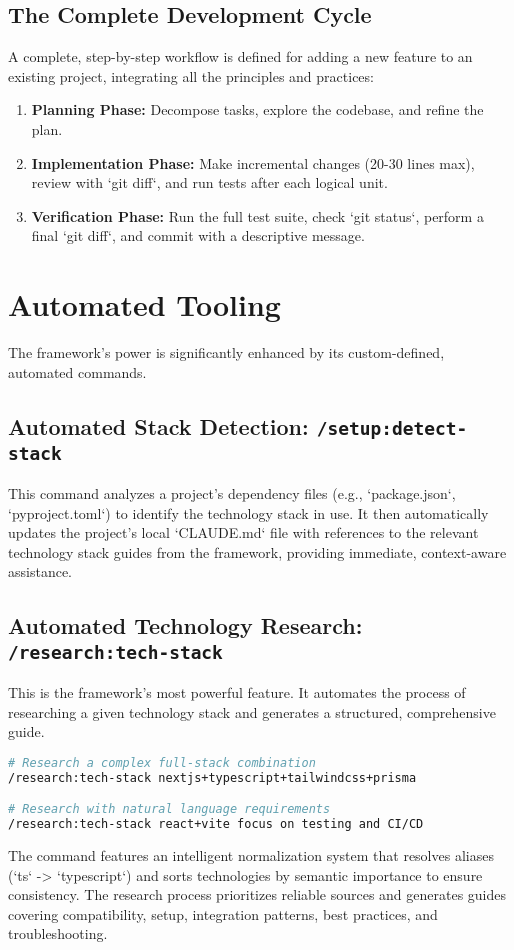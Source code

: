 \documentclass[preprint,12pt]{elsarticle}
\begin{document}
\subsection{The Complete Development Cycle}
A complete, step-by-step workflow is defined for adding a new feature to an existing project, integrating all the principles and practices:
\begin{enumerate}
    \item \textbf{Planning Phase:} Decompose tasks, explore the codebase, and refine the plan.
    \item \textbf{Implementation Phase:} Make incremental changes (20-30 lines max), review with `git diff`, and run tests after each logical unit.
    \item \textbf{Verification Phase:} Run the full test suite, check `git status`, perform a final `git diff`, and commit with a descriptive message.
\end{enumerate}

\section{Automated Tooling}
The framework's power is significantly enhanced by its custom-defined, automated commands.

\subsection{Automated Stack Detection: \texttt{/setup:detect-stack}}
This command analyzes a project's dependency files (e.g., `package.json`, `pyproject.toml`) to identify the technology stack in use. It then automatically updates the project's local `CLAUDE.md` file with references to the relevant technology stack guides from the framework, providing immediate, context-aware assistance.

\subsection{Automated Technology Research: \texttt{/research:tech-stack}}
This is the framework's most powerful feature. It automates the process of researching a given technology stack and generates a structured, comprehensive guide.
\begin{lstlisting}[language=bash, caption={Usage of the research command}]
# Research a complex full-stack combination
/research:tech-stack nextjs+typescript+tailwindcss+prisma

# Research with natural language requirements
/research:tech-stack react+vite focus on testing and CI/CD
\end{lstlisting}
The command features an intelligent normalization system that resolves aliases (`ts` -> `typescript`) and sorts technologies by semantic importance to ensure consistency. The research process prioritizes reliable sources and generates guides covering compatibility, setup, integration patterns, best practices, and troubleshooting.
\end{document}
